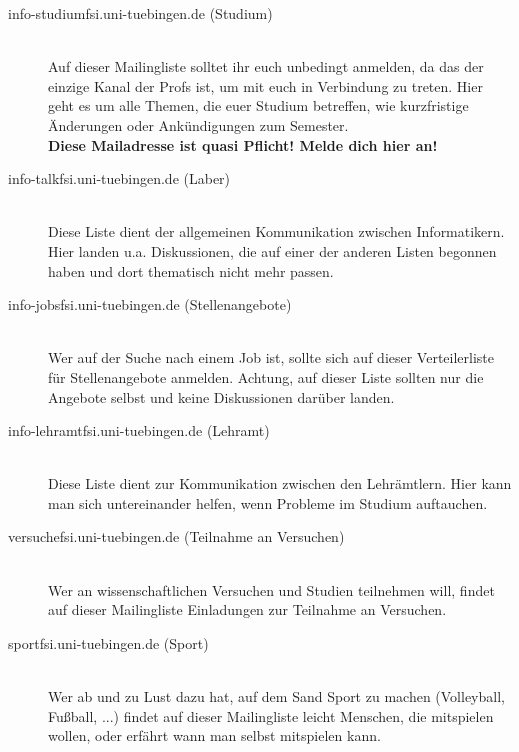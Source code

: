 \begin{description}

  \item[info-studium\At fsi.uni-tuebingen.de (Studium)] ~\\
  	Auf dieser Mailingliste solltet ihr euch unbedingt anmelden, da das der einzige 
  	Kanal der Profs ist, um mit euch in Verbindung zu treten. Hier geht es um alle 
  	Themen, die euer Studium betreffen, wie kurzfristige Änderungen oder Ankündigungen 
  	zum Semester. \\
    \textbf{Diese Mailadresse ist quasi Pflicht! Melde dich hier an!}


  \item[info-talk\At fsi.uni-tuebingen.de (Laber)] ~\\
    Diese Liste dient der allgemeinen Kommunikation zwischen Informatikern.
    Hier landen u.a. Diskussionen, die auf einer der anderen Listen begonnen
    haben und dort thematisch nicht mehr passen.


  \item[info-jobs\At fsi.uni-tuebingen.de (Stellenangebote)] ~\\
    Wer auf der Suche nach einem Job ist, sollte sich auf dieser Verteilerliste
    für Stellenangebote anmelden. Achtung, auf dieser Liste sollten nur die
    Angebote selbst und keine Diskussionen darüber landen.


  \item[info-lehramt\At fsi.uni-tuebingen.de (Lehramt)] ~\\
  Diese Liste dient zur Kommunikation zwischen den Lehrämtlern. Hier kann man sich 
  untereinander helfen, wenn Probleme im Studium auftauchen.
  
  
  \item[versuche\At fsi.uni-tuebingen.de (Teilnahme an Versuchen)] ~\\
    Wer an wissenschaftlichen Versuchen und Studien teilnehmen will, findet auf dieser 
    Mailingliste Einladungen zur Teilnahme an Versuchen.
  
    
  \item[sport\At fsi.uni-tuebingen.de (Sport)] ~\\
  	Wer ab und zu Lust dazu hat, auf dem Sand Sport zu machen (Volleyball, Fußball, ...) 
  	findet auf dieser Mailingliste leicht Menschen, die mitspielen wollen, oder erfährt 
  	wann man selbst mitspielen kann.
  	

\end{description}
